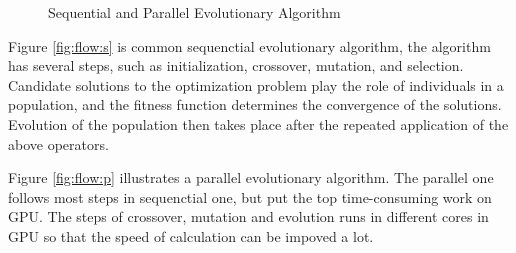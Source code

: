 \begin{figure}[!ht]
\begin{minipage}{0.29\textwidth}
{    }
  \end{minipage}
  \begin{minipage}{0.58\textwidth}
    \centering
  \end{minipage}
  \caption{Sequential and Parallel Evolutionary Algorithm}
  \label{fig:flow}
\end{figure}


Figure \ref{fig:flow:s} is common sequenctial evolutionary algorithm, the
algorithm has several steps, such as initialization, crossover, mutation, and
selection. Candidate solutions to the optimization problem play the role of
individuals in a population, and the fitness function determines the convergence
of the solutions. Evolution of the population then takes place after the
repeated application of the above operators.


Figure \ref{fig:flow:p} illustrates a parallel evolutionary algorithm. The
parallel one follows most steps in sequenctial one, but put the top
time-consuming work on GPU. The steps of crossover, mutation and evolution runs
in different cores in GPU so that the speed of calculation can be impoved a lot.




